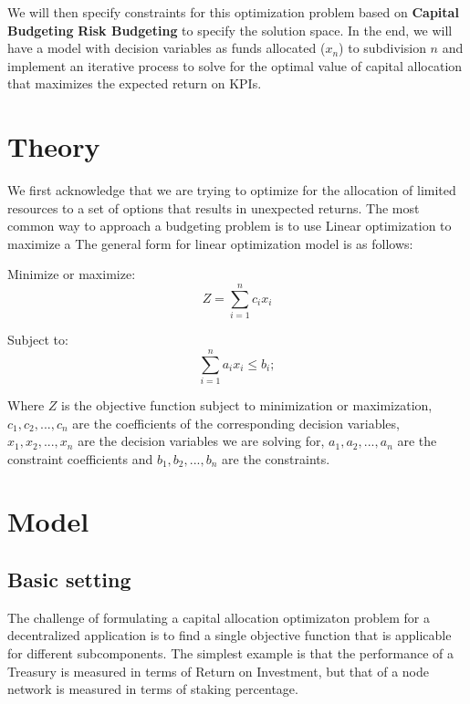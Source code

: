 \documentclass[conference,letterpaper]{IEEEtran}
\begin{document}
            We will then specify constraints for this optimization problem based on
            \textbf{Capital Budgeting} \textbf{Risk Budgeting} to specify the solution
            space. In the end, we will have a model with decision variables as funds
            allocated ($x_n$) to subdivision $n$ and implement an iterative process to
            solve for the optimal value of capital allocation that maximizes the expected
            return on KPIs.
        
    \section{Theory}
        We first acknowledge that we are trying to optimize for the allocation of limited
        resources to a set of options that results in unexpected returns. The most common
        way to approach a budgeting problem is to use Linear optimization to maximize a
        The general form for linear optimization model is as follows:

        Minimize or maximize: 
        \begin{equation} 
            Z = \sum_{i=1}^{n} c_i x_i            
        \end{equation}

        Subject to: 
        \begin{equation} 
            \sum_{i=1}^{n} a_i x_i \le b_i;
        \end{equation} 
        
        Where $Z$ is the objective function subject to minimization or maximization, $c_1,
        c_2, ..., c_n$ are the coefficients of the corresponding decision variables, $x_1,
        x_2, ..., x_n$ are the decision variables we are solving for, $a_1, a_2, ..., a_n$
        are the constraint coefficients and $b_1,b_2, ..., b_n$ are the constraints.

    \section{Model}
        \subsection{Basic setting}
            The challenge of formulating a capital allocation optimizaton problem for a
            decentralized application is to find a single objective function that is
            applicable for different subcomponents. The simplest example is that the
            performance of a Treasury is measured in terms of Return on Investment, but
            that of a node network is measured in terms of staking percentage.
\end{document}
